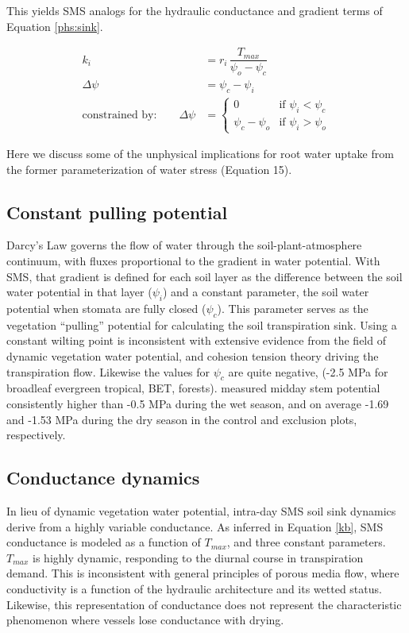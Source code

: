 \documentclass[draft,linenumbers]{agujournal}
\begin{document}
    This yields SMS analogs for the hydraulic conductance and gradient terms of Equation \ref{phs:sink}.
    \begin{linenomath*}
    \begin{equation} \begin{aligned}
    k_i &= r_i \, \dfrac{T_{max}}{\psi_{o}-\psi_{c}} \\
    \Delta\psi &=  \psi_{c}-\psi_i \\
    \mbox{constrained by:} \qquad
    \Delta\psi &=
    \begin{cases}
    0                          & \text{if } \psi_i<\psi_{c}  \\
    \psi_{c}-\psi_{o} & \text{if } \psi_i>\psi_{o}
    \label{kb}
    \end{cases}
    \end{aligned}\end{equation}
    \end{linenomath*}

    Here we discuss some of the unphysical implications for root water uptake from the former parameterization of water stress (Equation 15).
    
    \subsection{Constant pulling potential}
    Darcy's Law governs the flow of water through the soil-plant-atmosphere continuum, 
    with fluxes proportional to the gradient in water potential. 
    With SMS, that gradient is defined for each soil layer as 
    the difference between the soil water potential in that layer ($\psi_i$) 
    and a constant parameter, the soil water potential when stomata are fully closed ($\psi_{c}$).
    This parameter serves as the vegetation ``pulling'' potential for calculating the soil transpiration sink.
    Using a constant wilting point is inconsistent with extensive evidence from the field of dynamic vegetation water potential, and cohesion tension theory driving the transpiration flow.
    Likewise the values for $\psi_{c}$ are quite negative, (-2.5 MPa for broadleaf evergreen tropical, BET, forests). 
    \cite{fisher2006} measured midday stem potential consistently higher than -0.5 MPa during the wet season, and on average -1.69 and -1.53 MPa during the dry season in the control and exclusion plots, respectively.
    
    \subsection{Conductance dynamics}
    In lieu of dynamic vegetation water potential, intra-day SMS soil sink dynamics derive from a highly variable conductance.
    As inferred in Equation \ref{kb}, SMS conductance is modeled as a function of $T_{max}$, and three constant parameters.
    $T_{max}$ is highly dynamic, responding to the diurnal course in transpiration demand.
    This is inconsistent with general principles of porous media flow, where conductivity is a function of the hydraulic architecture and its wetted status.
    Likewise, this representation of conductance does not represent the characteristic phenomenon where vessels lose conductance with drying.
      
\end{document}
